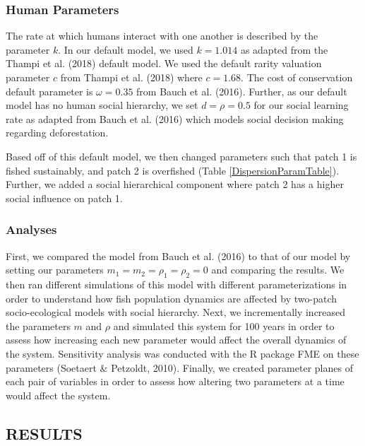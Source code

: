 \documentclass[
]{article}
\begin{document}
\hypertarget{human-parameters}{%
\subsubsection{Human Parameters}\label{human-parameters}}

The rate at which humans interact with one another is described by the parameter \(k\). In our default model, we used \(k = 1.014\) as adapted from the Thampi et al. (2018) default model. We used the default rarity valuation parameter \(c\) from Thampi et al. (2018) where \(c = 1.68\). The cost of conservation default parameter is \(\omega = 0.35\) from Bauch et al. (2016). Further, as our default model has no human social hierarchy, we set \(d = \rho = 0.5\) for our social learning rate as adapted from Bauch et al. (2016) which models social decision making regarding deforestation.

Based off of this default model, we then changed parameters such that patch 1 is fished sustainably, and patch 2 is overfished (Table \ref{DispersionParamTable}). Further, we added a social hierarchical component where patch 2 has a higher social influence on patch 1.

\hypertarget{analyses}{%
\subsubsection{Analyses}\label{analyses}}

First, we compared the model from Bauch et al. (2016) to that of our model by setting our parameters \(m_1 = m_2 = \rho_1 = \rho_2 = 0\) and comparing the results. We then ran different simulations of this model with different parameterizations in order to understand how fish population dynamics are affected by two-patch socio-ecological models with social hierarchy. Next, we incrementally increased the parameters \(m\) and \(\rho\) and simulated this system for 100 years in order to assess how increasing each new parameter would affect the overall dynamics of the system. Sensitivity analysis was conducted with the R package FME on these parameters (Soetaert \& Petzoldt, 2010). Finally, we created parameter planes of each pair of variables in order to assess how altering two parameters at a time would affect the system.

\hypertarget{results-1}{%
\subsection{RESULTS}\label{results-1}}
\end{document}
